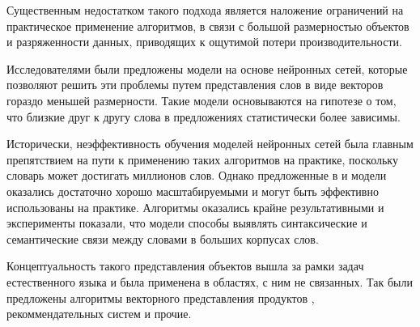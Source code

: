 \documentclass[times,specification,annotation]{itmo-student-thesis}
\begin{document}
Существенным недостатком такого подхода является наложение ограничений на практическое применение алгоритмов, в связи с большой размерностью объектов и разряженности данных, приводящих к ощутимой потери производительности.

Исследователями были предложены модели на основе нейронных сетей\cite{turian2010}, которые позволяют решить эти проблемы путем представления слов в виде векторов гораздо меньшей размерности. Такие модели основываются на гипотезе о том, что близкие друг к другу слова в предложениях статистически более зависимы.

Исторически, неэффективность обучения моделей нейронных сетей была главным препятствием на пути к применению таких алгоритмов на практике, поскольку словарь может достигать миллионов слов. Однако предложенные в \cite{mikolov2013efficient} и \cite{mikolov2013distributed} модели оказались достаточно хорошо масштабируемыми и могут быть эффективно использованы на практике. Алгоритмы оказались крайне результативными и эксперименты показали, что модели способы выявлять синтаксические и семантические связи между словами в больших корпусах слов. 

Концептуальность такого представления объектов вышла за рамки задач естественного языка и была применена в областях, с ним не связанных. Так были предложены алгоритмы векторного представления продуктов \cite{grbovic2015commerce}, рекоммендательных систем \cite{ozsoy2016word} и прочие.



\end{document}
